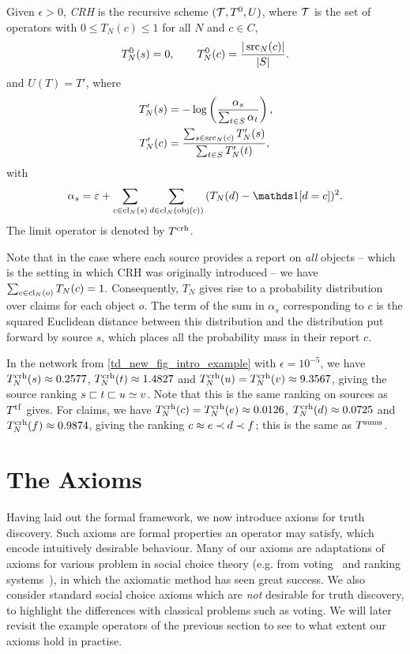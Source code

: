 \begin{definition}
    Given $\epsilon > 0$, \emph{CRH} is the recursive scheme $(\mathcal{T}, T^0, U)$,
    where $\mathcal{T}$ is the set of operators with $0 \le T_N(c) \le 1$ for all $N$
    and $c \in C$,
    \[
        T^0_N(s) = 0, \qquad
        T^0_N(c) = \frac{|\operatorname{src}_N(c)|}{|S|}.
    \]
    and $U(T) = T'$, where
    \begin{align*}
        T'_N(s) &= -\log\left(\frac{\alpha_s}{\sum_{t \in S}{\alpha_t}}\right), \\
        T'_N(c) &=
            \frac{\sum_{s \in \operatorname{src}_N(c)}{T'_N(s)}}{\sum_{t \in S}{T'_N(t)}},
    \end{align*}
    with
    \[
        \alpha_s = \epsilon + \sum_{c \in \claims_N(s)}{
            \sum_{d \in \claims_N(\obj(c))}{
                (T_N(d) - \indicator{d = c})^2
            }
        }.
    \]
    The limit operator is denoted by $T^{\operatorname{crh}}$.
\end{definition}

Note that in the case where each source provides a report on \emph{all} objects
-- which is the setting in which CRH was originally introduced -- we have
$\sum_{c \in \operatorname{cl}_N(o)}{T_N(c)} = 1$. Consequently, $T_N$ gives rise to a
probability distribution over claims for each object $o$. The term of the sum
in $\alpha_s$ corresponding to $c$ is the squared Euclidean distance between
this distribution and the distribution put forward by source $s$, which places
all the probability mass in their report $c$.

In the network from \cref{td_new_fig_intro_example} with $\epsilon = 10^{-5}$,
we have $T^{\operatorname{crh}}_N(s) \approx 0.2577$, $T^{\operatorname{crh}}_N(t) \approx 1.4827$ and $T^{\operatorname{crh}}_N(u) =
T^{\operatorname{crh}}_N(v) \approx 9.3567$, giving the source ranking $s \sqsubset t \sqsubset u \simeq v$.
Note that this is the same ranking on sources as $T^{\operatorname{tf}}$ gives. For
claims, we have $T^{\operatorname{crh}}_N(c) = T^{\operatorname{crh}}_N(e) \approx 0.0126$, $T^{\operatorname{crh}}_N(d) \approx
0.0725$ and $T^{\operatorname{crh}}_N(f) \approx 0.9874$, giving the ranking $c \approx e \prec d
\prec f$; this is the same as $T^{\operatorname{sums}}$.

\section{The Axioms}

Having laid out the formal framework, we now introduce axioms for truth
discovery. Such axioms are formal properties an operator may satisfy, which
encode intuitively desirable behaviour. Many of our axioms are adaptations of
axioms for various problem in social choice theory (e.g. from
voting~\cite{zwicker2016voting} and ranking systems~\cite{altman2008}), in
which the axiomatic method has seen great success. We also consider standard
social choice axioms which are \emph{not} desirable for truth discovery, to
highlight the differences with classical problems such as voting. We will later
revisit the example operators of the previous section to see to what extent our
axioms hold in practise.

